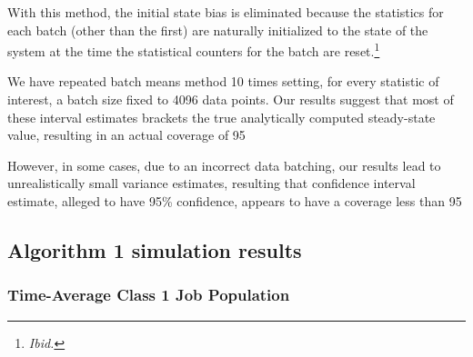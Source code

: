 \documentclass[10pt,a4paper]{article}
\begin{document}
With this method, the initial state bias is eliminated because the statistics for each batch (other than the first) are naturally initialized to the state of the system at the time the statistical counters for the batch are reset.\footnote{\textit{Ibid.}}

We have repeated batch means method 10 times setting, for every statistic of interest, a batch size fixed to 4096 data points. Our results suggest that most of these interval estimates brackets the true analytically computed steady-state value, resulting in an actual coverage of 95%

However, in some cases, due to an incorrect data batching, our results lead to unrealistically small variance estimates, resulting that confidence interval estimate, alleged to have 95\% confidence, appears to have a coverage less than 95%

\clearpage
\newpage
\subsection{Algorithm 1 simulation results}


\subsubsection{Time-Average Class 1 Job Population}
\end{document}
